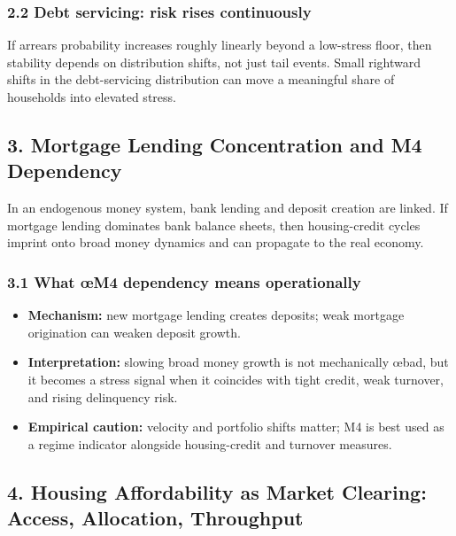 \documentclass[
]{article}
\providecommand{\tightlist}{%
  \setlength{\itemsep}{0pt}\setlength{\parskip}{0pt}}
\begin{document}
\subsubsection{2.2 Debt servicing: risk rises
continuously}\label{debt-servicing-risk-rises-continuously}

If arrears probability increases roughly linearly beyond a low-stress
floor, then stability depends on distribution shifts, not just tail
events. Small rightward shifts in the debt-servicing distribution can
move a meaningful share of households into elevated stress.

\subsection{3. Mortgage Lending Concentration and M4
Dependency}\label{mortgage-lending-concentration-and-m4-dependency}

In an endogenous money system, bank lending and deposit creation are
linked. If mortgage lending dominates bank balance sheets, then
housing-credit cycles imprint onto broad money dynamics and can
propagate to the real economy.

\subsubsection{3.1 What œM4 dependency means
operationally}\label{what-ux153m4-dependency-means-operationally}

\begin{itemize}
\tightlist
\item
  \textbf{Mechanism:} new mortgage lending creates deposits; weak
  mortgage origination can weaken deposit growth.
\item
  \textbf{Interpretation:} slowing broad money growth is not
  mechanically œbad, but it becomes a stress signal when it coincides
  with tight credit, weak turnover, and rising delinquency risk.
\item
  \textbf{Empirical caution:} velocity and portfolio shifts matter; M4
  is best used as a regime indicator alongside housing-credit and
  turnover measures.
\end{itemize}

\subsection{4. Housing Affordability as Market Clearing: Access,
Allocation,
Throughput}\label{housing-affordability-as-market-clearing-access-allocation-throughput}
\end{document}
